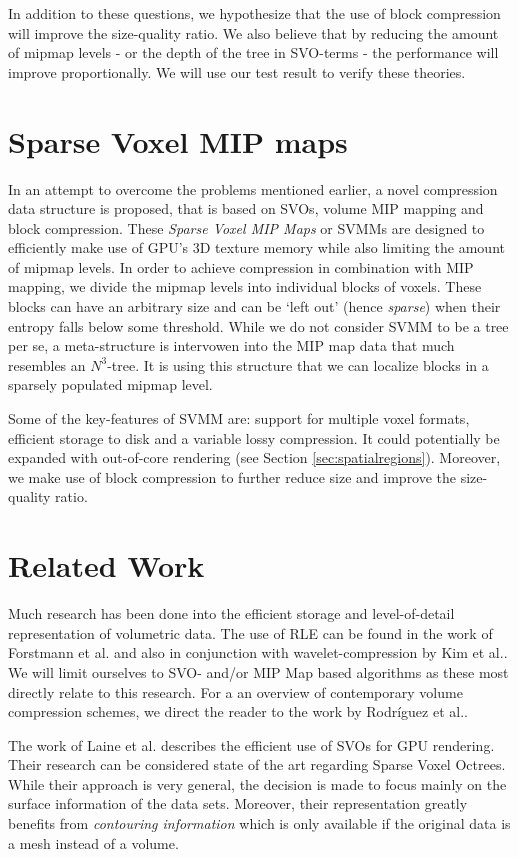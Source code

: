 In addition to these questions, we hypothesize that the use of block compression will improve the size-quality ratio. We also believe that by reducing the amount of mipmap levels - or the depth of the tree in SVO-terms - the performance will improve proportionally. We will use our test result to verify these theories.
%
\section{Sparse Voxel MIP maps }
%
In an attempt to overcome the problems mentioned earlier, a novel compression data structure is proposed, that is based on SVOs, volume MIP mapping and block compression. These \emph{Sparse Voxel MIP Maps} or SVMMs are designed to efficiently make use of GPU's 3D texture memory while also limiting the amount of mipmap levels. In order to achieve compression in combination with MIP mapping, we divide the mipmap levels into individual blocks of voxels. These blocks can have an arbitrary size and can be `left out' (hence \emph{sparse}) when their entropy falls below some threshold. While we do not consider SVMM to be a tree per se, a meta-structure is intervowen into the MIP map data that much resembles an $N^3$-tree. It is using this structure that we can localize blocks in a sparsely populated mipmap level.

Some of the key-features of SVMM are: support for multiple voxel formats, efficient storage to disk and a variable lossy compression. It could potentially be expanded with out-of-core rendering (see Section \ref{sec:spatialregions}). Moreover, we make use of block compression to further reduce size and improve the size-quality ratio.
%
\section{Related Work}  \label{ch:relatedwork}
%
%
Much research has been done into the efficient storage and level-of-detail representation of volumetric data. The use of RLE can be found in the work of Forstmann et al.\cite{forstmann11} and also in conjunction with wavelet-compression by Kim et al.\cite{wavelet99}. We will limit ourselves to SVO- and/or MIP Map based algorithms as these most directly relate to this research. For a an overview of contemporary volume compression schemes, we direct the reader to the work by Rodríguez et al.\cite{stateoftheart14}.

The work of Laine et al.\cite{efficientsvo10} describes the efficient use of SVOs for GPU rendering. Their research can be considered state of the art regarding Sparse Voxel Octrees. While their approach is very general, the decision is made to focus mainly on the surface information of the data sets. Moreover, their representation greatly benefits from \emph{contouring information} which is only available if the original data is a mesh instead of a volume. 

